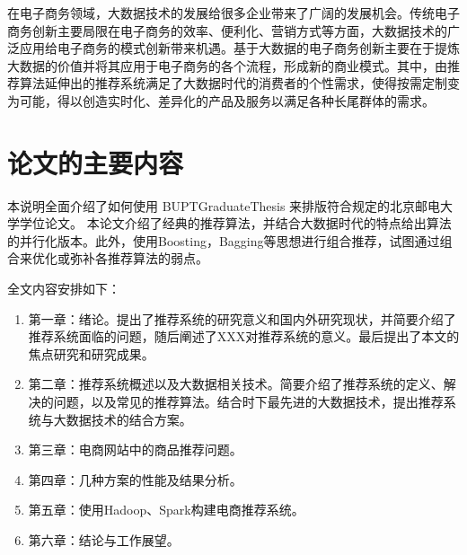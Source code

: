 在电子商务领域，大数据技术的发展给很多企业带来了广阔的发展机会。传统电子商务创新主要局限在电子商务的效率、便利化、营销方式等方面，大数据技术的广泛应用给电子商务的模式创新带来机遇。基于大数据的电子商务创新主要在于提炼大数据的价值并将其应用于电子商务的各个流程，形成新的商业模式\cite{大数据背景下电子商务的价值创造与模式创新}。其中，由推荐算法延伸出的推荐系统满足了大数据时代的消费者的个性需求，使得按需定制变为可能，得以创造实时化、差异化的产品及服务以满足各种长尾群体的需求。


\section{论文的主要内容}
本说明全面介绍了如何使用 BUPTGraduateThesis 来排版符合规定的北京邮电大学学位论文。
本论文介绍了经典的推荐算法，并结合大数据时代的特点给出算法的并行化版本。此外，使用Boosting，Bagging等思想进行组合推荐，试图通过组合来优化或弥补各推荐算法的弱点。

全文内容安排如下：
\begin{enumerate}
\item 第一章：绪论。提出了推荐系统的研究意义和国内外研究现状，并简要介绍了推荐系统面临的问题，随后阐述了XXX对推荐系统的意义。最后提出了本文的焦点研究和研究成果。
\item 第二章：推荐系统概述以及大数据相关技术。简要介绍了推荐系统的定义、解决的问题，以及常见的推荐算法。结合时下最先进的大数据技术，提出推荐系统与大数据技术的结合方案。
\item 第三章：电商网站中的商品推荐问题。
\item 第四章：几种方案的性能及结果分析。
\item 第五章：使用Hadoop、Spark构建电商推荐系统。
\item 第六章：结论与工作展望。
\end{enumerate}

\ifx\usechapbib\empty
\nocite{BSTcontrol}
\setcounter{NAT@ctr}{0}


\fi
